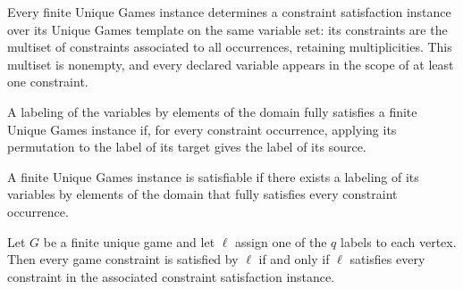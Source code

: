 \begin{definition}
\label{FABL.FiniteUniqueGame.toCSPInstance}
\leanok
{}
Every finite Unique Games instance determines a constraint satisfaction instance over
its Unique Games template on the same variable set: its constraints are the multiset of
constraints associated to all occurrences, retaining multiplicities. This multiset is
nonempty, and every declared variable appears in the scope of at least one constraint.
\end{definition}

\begin{definition}
\label{FABL.FiniteUniqueGame.FullySatisfied}
\leanok
A labeling of the variables by elements of the domain fully satisfies a finite Unique
Games instance if, for every constraint occurrence, applying its permutation to the
label of its target gives the label of its source.
\end{definition}

\begin{definition}
\label{FABL.FiniteUniqueGame.Satisfiable}
\leanok
{}
A finite Unique Games instance is satisfiable if there exists a labeling of its
variables by elements of the domain that fully satisfies every constraint occurrence.
\end{definition}

\begin{theorem}
\label{FABL.FiniteUniqueGame.fullySatisfied_iff_csp}
\leanok
{}
Let $G$ be a finite unique game and let $\ell$ assign one of the $q$ labels to each
vertex. Then every game constraint is satisfied by $\ell$ if and only if $\ell$
satisfies every constraint in the associated constraint satisfaction instance.
\end{theorem}


